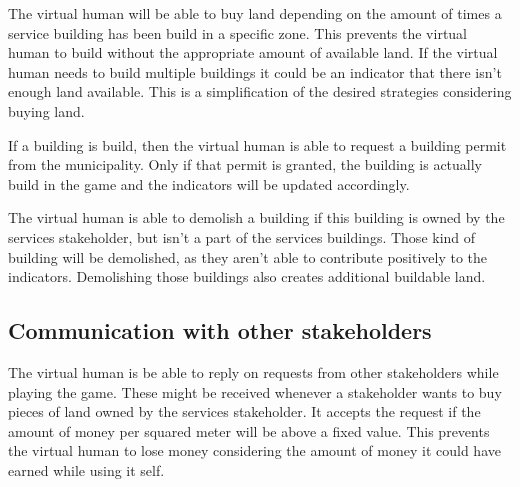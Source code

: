 The virtual human will be able to buy land depending on the amount of times a service building has been build in a specific zone. This prevents the virtual human to build without the appropriate amount of available land. If the virtual human needs to build multiple buildings it could be an indicator that there isn't enough land available. This is a simplification of the desired strategies considering buying land.

If a building is build, then the virtual human is able to request a building permit from the municipality. Only if that permit is granted, the building is actually build in the game and the indicators will be updated accordingly.

The virtual human is able to demolish a building if this building is owned by the services stakeholder, but isn't a part of the services buildings. Those kind of building will be demolished, as they aren't able to contribute positively to the indicators. Demolishing those buildings also creates additional buildable land.


\subsection{Communication with other stakeholders}
The virtual human is be able to reply on requests from other stakeholders while playing the game. These might be received whenever a stakeholder wants to buy pieces of land owned by the services stakeholder. It accepts the request if the amount of money per squared meter will be above a fixed value. This prevents the virtual human to lose money considering the amount of money it could have earned while using it self.

